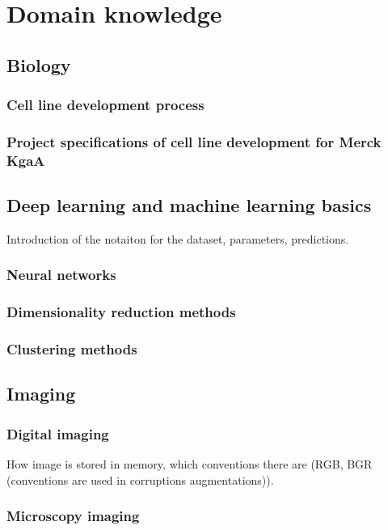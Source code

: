 \section{Domain knowledge}
    \subsection{Biology}
        \subsubsection{Cell line development process}
        
        \subsubsection{Project specifications of cell line development for Merck KgaA}
        
    \subsection{Deep learning and machine learning basics}
        Introduction of the notaiton for the dataset, parameters, predictions.
        \subsubsection{Neural networks}
            
        \subsubsection{Dimensionality reduction methods}
            
        \subsubsection{Clustering methods}
            
    \subsection{Imaging}
        \subsubsection{Digital imaging}
            
            How image is stored in memory, which conventions there are (RGB, BGR (conventions are used in corruptions augmentations)).
        \subsubsection{Microscopy imaging}
            